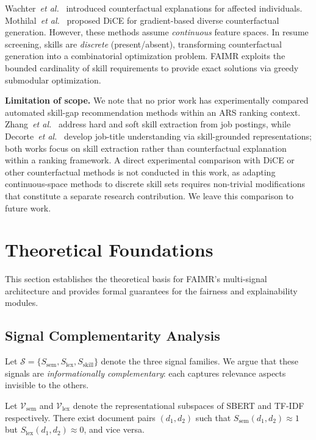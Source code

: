\documentclass{llncs}
\begin{document}
Wachter~\textit{et al.}~\cite{wachter2017counterfactual} introduced counterfactual explanations for affected individuals. Mothilal~\textit{et al.}~\cite{mothilal2020dice} proposed DiCE for gradient-based diverse counterfactual generation. However, these methods assume \textit{continuous} feature spaces. In resume screening, skills are \textit{discrete} (present/absent), transforming counterfactual generation into a combinatorial optimization problem. FAIMR exploits the bounded cardinality of skill requirements to provide exact solutions via greedy submodular optimization.

\textbf{Limitation of scope.} We note that no prior work has experimentally compared automated skill-gap recommendation methods within an ARS ranking context. Zhang~\textit{et al.}~\cite{zhang2022skillspan} address hard and soft skill extraction from job postings, while Decorte~\textit{et al.}~\cite{decorte2022jobbert} develop job-title understanding via skill-grounded representations; both works focus on skill extraction rather than counterfactual explanation within a ranking framework. A direct experimental comparison with DiCE or other counterfactual methods is not conducted in this work, as adapting continuous-space methods to discrete skill sets requires non-trivial modifications that constitute a separate research contribution. We leave this comparison to future work.

\section{Theoretical Foundations}\label{sec:theory}

This section establishes the theoretical basis for FAIMR's multi-signal architecture and provides formal guarantees for the fairness and explainability modules.

\subsection{Signal Complementarity Analysis}

Let $\mathcal{S} = \{S_\text{sem}, S_\text{lex}, S_\text{skill}\}$ denote the three signal families. We argue that these signals are \textit{informationally complementary}: each captures relevance aspects invisible to the others.

\begin{proposition}\label{prop:orth}
Let $\mathcal{V}_\text{sem}$ and $\mathcal{V}_\text{lex}$ denote the representational subspaces of SBERT and TF-IDF respectively. There exist document pairs $(d_1, d_2)$ such that $S_\text{sem}(d_1, d_2) \approx 1$ but $S_\text{lex}(d_1, d_2) \approx 0$, and vice versa.
\end{proposition}
\end{document}
